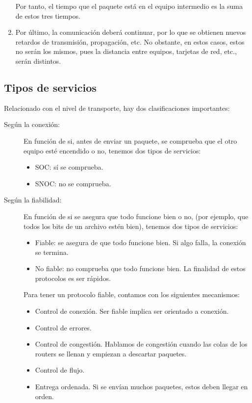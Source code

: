 \begin{enumerate}
    Por tanto, el tiempo que el paquete está en el equipo intermedio es la suma de estos tres tiempos.

    \item Por último, la comunicación deberá continuar, por lo que se obtienen nuevos retardos de transmisión, propagación, etc. No obstante, en estos casos, estos no serán los mismos, pues la distancia entre equipos, tarjetas de red, etc., serán distintos.
\end{enumerate}


\subsection{Tipos de servicios}
Relacionado con el nivel de transporte, hay dos clasificaciones importantes:
\begin{description}
    \item[Según la conexión:] En función de si, antes de enviar un paquete, se comprueba que el otro equipo esté encendido o no, tenemos dos tipos de servicios:
    \begin{itemize}
        \item \acrfull{SOC}: sí se comprueba.
        \item \acrfull{SNOC}: no se comprueba.
    \end{itemize}

    \item[Según la fiabilidad:] En función de si se asegura que todo funcione bien o no, (por ejemplo, que todos los bits de un archivo estén bien), tenemos dos tipos de servicios:
    \begin{itemize}
        \item Fiable: se asegura de que todo funcione bien. Si algo falla, la conexión se termina.
        \item No fiable: no comprueba que todo funcione bien. La finalidad de estos protocolos es ser rápidos.
    \end{itemize}

    Para tener un protocolo fiable, contamos con los siguientes mecanismos:
    \begin{itemize}
        \item Control de conexión. Ser fiable implica ser orientado a conexión.
        \item Control de errores.
        \item Control de congestión. Hablamos de congestión cuando las colas de los routers se llenan y empiezan a descartar paquetes.
        \item Control de flujo.
        \item Entrega ordenada. Si se envían muchos paquetes, estos deben llegar en orden.
    \end{itemize}
\end{description}

